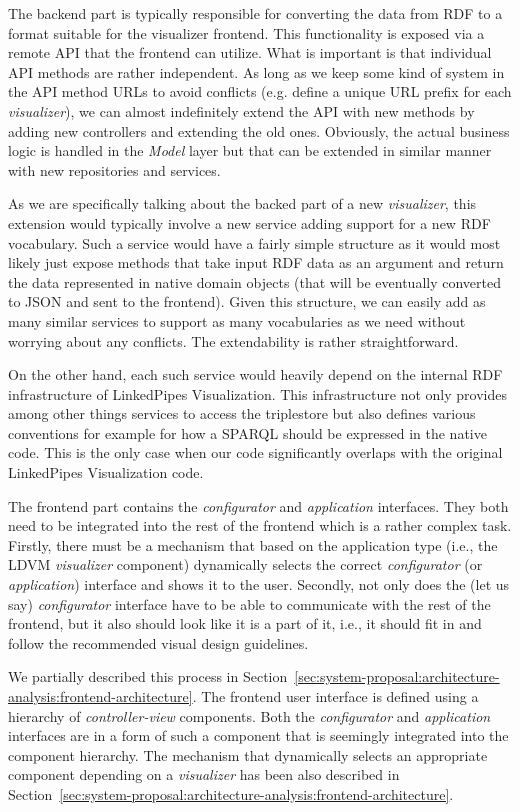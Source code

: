 The backend part is typically responsible for converting the data from RDF to a format suitable for the visualizer frontend. This functionality is exposed via a remote API that the frontend can utilize. What is important is that individual API methods are rather independent. As long as we keep some kind of system in the API method URLs to avoid conflicts (e.g. define a unique URL prefix for each \emph{visualizer}), we can almost indefinitely extend the API with new methods by adding new controllers and extending the old ones. Obviously, the actual business logic is handled in the \emph{Model} layer but that can be extended in similar manner with new repositories and services.

As we are specifically talking about the backed part of a new \emph{visualizer}, this extension would typically involve a new service adding support for a new RDF vocabulary.  Such a service would have a fairly simple structure as it would most likely just expose methods that take input RDF data as an argument and return the data represented in native domain objects (that will be eventually converted to JSON and sent to the frontend). Given this structure, we can easily add as many similar services to support as many vocabularies as we need without worrying about any conflicts. The extendability is rather straightforward.

On the other hand, each such service would heavily depend on the internal RDF infrastructure of LinkedPipes Visualization. This infrastructure not only provides among other things services to access the triplestore but also defines various conventions for example for how a SPARQL should be expressed in the native code. This is the only case when our code significantly overlaps with the original LinkedPipes Visualization code.

The frontend part contains the \emph{configurator} and \emph{application} interfaces. They both need to be integrated into the rest of the frontend which is a rather complex task. Firstly, there must be a mechanism that based on the application type (i.e., the LDVM \emph{visualizer} component) dynamically selects the correct \emph{configurator} (or \emph{application}) interface and shows it to the user. Secondly, not only does the (let us say) \emph{configurator} interface have to be able to communicate with the rest of the frontend, but it also should  look like it is a part of it, i.e., it should fit in and follow the recommended visual design guidelines. 

We partially described this process in Section~\ref{sec:system-proposal:architecture-analysis:frontend-architecture}. The frontend user interface is defined using a hierarchy of \emph{controller-view} components. Both the \emph{configurator} and \emph{application} interfaces are in a form of such a component that is seemingly integrated into the component hierarchy. The mechanism that dynamically selects an appropriate component depending on a \emph{visualizer} has been also described in Section~\ref{sec:system-proposal:architecture-analysis:frontend-architecture}. 

